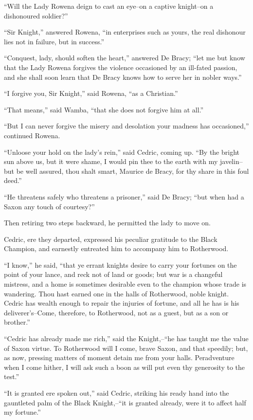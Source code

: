 ``Will the Lady Rowena deign to cast an eye--on a captive knight--on a
dishonoured soldier?''

``Sir Knight,'' answered Rowena, ``in enterprises such as yours, the
real dishonour lies not in failure, but in success.''

``Conquest, lady, should soften the heart,'' answered De Bracy; ``let me
but know that the Lady Rowena forgives the violence occasioned by an
ill-fated passion, and she shall soon learn that De Bracy knows how to
serve her in nobler ways.''

``I forgive you, Sir Knight,'' said Rowena, ``as a Christian.''

``That means,'' said Wamba, ``that she does not forgive him at all.''

``But I can never forgive the misery and desolation your madness has
occasioned,'' continued Rowena.

``Unloose your hold on the lady's rein,'' said Cedric, coming up. ``By
the bright sun above us, but it were shame, I would pin thee to the
earth with my javelin--but be well assured, thou shalt smart, Maurice de
Bracy, for thy share in this foul deed.''

``He threatens safely who threatens a prisoner,'' said De Bracy; ``but
when had a Saxon any touch of courtesy?''

Then retiring two steps backward, he permitted the lady to move on.

Cedric, ere they departed, expressed his peculiar gratitude to the Black
Champion, and earnestly entreated him to accompany him to Rotherwood.

``I know,'' he said, ``that ye errant knights desire to carry your
fortunes on the point of your lance, and reck not of land or goods; but
war is a changeful mistress, and a home is sometimes desirable even to
the champion whose trade is wandering. Thou hast earned one in the halls
of Rotherwood, noble knight. Cedric has wealth enough to repair the
injuries of fortune, and all he has is his deliverer's--Come, therefore,
to Rotherwood, not as a guest, but as a son or brother.''

``Cedric has already made me rich,'' said the Knight,--``he has taught
me the value of Saxon virtue. To Rotherwood will I come, brave Saxon,
and that speedily; but, as now, pressing matters of moment detain me
from your halls. Peradventure when I come hither, I will ask such a boon
as will put even thy generosity to the test.''

``It is granted ere spoken out,'' said Cedric, striking his ready hand
into the gauntleted palm of the Black Knight,--``it is granted already,
were it to affect half my fortune.''

